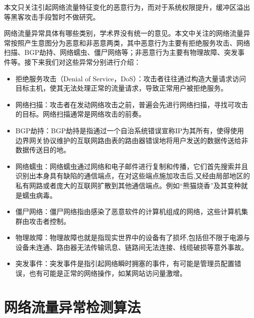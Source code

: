 

本文只关注引起网络流量特征变化的恶意行为，而对于系统权限提升，缓冲区溢出等黑客攻击手段暂时不做研究。


网络流量异常具体有哪些类别，学术界没有统一的意见。本文中关注的网络流量异常按照产生意图分为恶意和非恶意两类，其中恶意行为主要有拒绝服务攻击、网络扫描、BGP劫持、网络蠕虫、僵尸网络等；非恶意行为主要有物理故障、突发事件等。接下来我们对这些异常分别进行介绍：

\begin{itemize}
  \item 拒绝服务攻击（Denial of Service，DoS）：攻击者往往通过构造大量请求访问目标主机，使其无法处理正常的流量请求，导致正常用户被拒绝服务。
  \item 网络扫描：攻击者在发动网络攻击之前，普遍会先进行网络扫描，寻找可攻击的目标。网络扫描通常是网络攻击的前奏。
  \item BGP劫持：BGP劫持是指通过一个自治系统错误宣称IP为其所有，使得使用边界网关协议维护的互联网路由表的路由器错误地将用户发送的数据传送给非数据传送目的地。
  \item 网络蠕虫：网络蠕虫通过网络和电子邮件进行复制和传播，它们首先搜索并且识别出本身具有缺陷的通信端点，在对这些端点施加攻击后,又经由局部地区的私有网路或者庞大的互联网扩散到其他通信端点。例如“熊猫烧香”及其变种就是蠕虫病毒。
  \item 僵尸网络：僵尸网络指由感染了恶意软件的计算机组成的网络，这些计算机集群由攻击者控制。
  \item 物理故障：物理故障也就是指现实世界中的设备有了损坏,包括但不限于电源与设备未连通、路由器无法传输讯息、链路间无法连接、线缆破损等意外事故。
  \item  突发事件：突发事件是指引起网络瞬时拥塞的事件，有可能是管理员配置错误，也有可能是正常的网络操作，如某网站访问量激增。
\end{itemize}

\section{网络流量异常检测算法}


